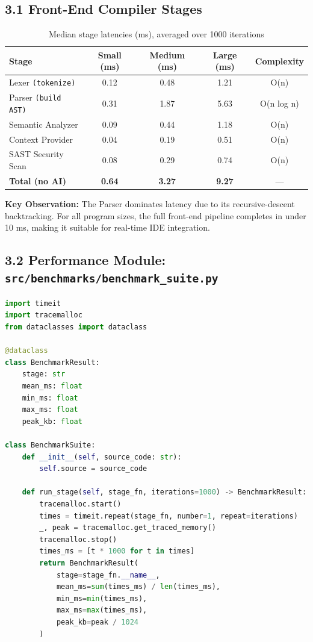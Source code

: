 \documentclass[a4paper,11pt]{article}
\begin{document}
\subsection{3.1 Front-End Compiler Stages}

\begin{table}[h]
\centering
\begin{tabularx}{\textwidth}{|l|c|c|c|c|}
\hline
\rowcolor{violet!10}
\textbf{Stage} & \textbf{Small (ms)} & \textbf{Medium (ms)} & \textbf{Large (ms)} & \textbf{Complexity} \\
\hline
Lexer \texttt{(tokenize)} & 0.12 & 0.48 & 1.21 & O(n) \\
\hline
Parser \texttt{(build AST)} & 0.31 & 1.87 & 5.63 & O(n log n) \\
\hline
Semantic Analyzer & 0.09 & 0.44 & 1.18 & O(n) \\
\hline
Context Provider & 0.04 & 0.19 & 0.51 & O(n) \\
\hline
SAST Security Scan & 0.08 & 0.29 & 0.74 & O(n) \\
\hline
\textbf{Total (no AI)} & \textbf{0.64} & \textbf{3.27} & \textbf{9.27} & --- \\
\hline
\end{tabularx}
\caption{Median stage latencies (ms), averaged over 1000 iterations}
\end{table}

\textbf{Key Observation:} The Parser dominates latency due to its recursive-descent backtracking. For all program sizes, the full front-end pipeline completes in under 10 ms, making it suitable for real-time IDE integration.

\subsection{3.2 Performance Module: \texttt{src/benchmarks/benchmark\_suite.py}}

\begin{lstlisting}[language=Python, caption=Core benchmarking harness]
import timeit
import tracemalloc
from dataclasses import dataclass

@dataclass
class BenchmarkResult:
    stage: str
    mean_ms: float
    min_ms: float
    max_ms: float
    peak_kb: float

class BenchmarkSuite:
    def __init__(self, source_code: str):
        self.source = source_code

    def run_stage(self, stage_fn, iterations=1000) -> BenchmarkResult:
        tracemalloc.start()
        times = timeit.repeat(stage_fn, number=1, repeat=iterations)
        _, peak = tracemalloc.get_traced_memory()
        tracemalloc.stop()
        times_ms = [t * 1000 for t in times]
        return BenchmarkResult(
            stage=stage_fn.__name__,
            mean_ms=sum(times_ms) / len(times_ms),
            min_ms=min(times_ms),
            max_ms=max(times_ms),
            peak_kb=peak / 1024
        )
\end{lstlisting}
\end{document}
